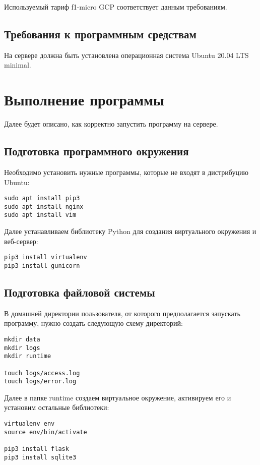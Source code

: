 \documentclass[progmanual]{espd}
\begin{document}
Используемый тариф f1-micro GCP соответствует данным требованиям.

\subsection{Требования к программным средствам}
На сервере должна быть установлена операционная система Ubuntu 20.04 LTS minimal.

\section{Выполнение программы}
Далее будет описано, как корректно запустить программу на сервере.

\subsection{Подготовка программного окружения}
Необходимо установить нужные программы, которые не входят в дистрибуцию Ubuntu:

\begin{verbatim}
sudo apt install pip3
sudo apt install nginx
sudo apt install vim
\end{verbatim}

Далее устанавливаем библиотеку Python для создания виртуального окружения и веб-сервер:

\begin{verbatim}
pip3 install virtualenv
pip3 install gunicorn
\end{verbatim}

\subsection{Подготовка файловой системы}
В домашней директории пользователя, от которого предполагается запускать программу, нужно создать следующую схему директорий:

\begin{verbatim}
mkdir data
mkdir logs
mkdir runtime

touch logs/access.log
touch logs/error.log
\end{verbatim}

Далее в папке runtime создаем виртуальное окружение, активируем его и установим остальные библиотеки:

\begin{verbatim}
virtualenv env
source env/bin/activate

pip3 install flask
pip3 install sqlite3
\end{verbatim}
\end{document}
